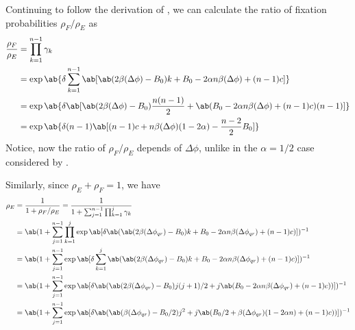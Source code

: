 Continuing to follow the derivation of \tripp{},
we can calculate the ratio of fixation probabilities $\rho_F/\rho_E$ as
\begin{equation}
  \begin{aligned}
    \frac{\rho_F}{\rho_E} &= \prod_{k=1}^{n-1} \gamma_k \\
           &= \exp \ab\{
                \delta
                \sum_{k=1}^{n-1}
                \ab[
    \ab(2 \beta(\Delta\phi) - B_0) k
                 + B_0 - 2 \alpha n \beta(\Delta\phi) + (n-1) c
                 ]
                 \} \\
           &= \exp \ab\{
                \delta
                \ab[
                \ab(2 \beta(\Delta\phi) - B_0) \frac{n(n-1)}{2}
                 + \ab(B_0 - 2 \alpha n \beta(\Delta\phi) + (n-1) c) (n-1)
                 ]
                 \} \\
           &= \exp \ab\{
                \delta (n-1)
                \ab[
                (n-1) c + n \beta(\Delta\phi) (1 - 2 \alpha)
                - \frac{n-2}{2} B_0
                 ]
                 \}
  \end{aligned}
  \label{eq:fixation_prob_ratio}
\end{equation}
Notice, now the ratio of $\rho_F/\rho_E$ depends of $\Delta \phi$,
unlike in the $\alpha=1/2$ case considered by \tripp{}.

Similarly, since $\rho_E + \rho_F = 1$, we have
\begin{equation}
  \begin{aligned}
    \rho_E &= \frac{1}{1+\rho_F/\rho_E}
           = \frac{1}{1+\sum_{j=1}^{n-1} \prod_{k=1}^j \gamma_k} \\
           &= \ab(1+\sum_{j=1}^{n-1} \prod_{k=1}^j \exp\ab[\delta \ab(
           \ab(2 \beta(\Delta\phi_{qr}) - B_0) k
           + B_0 - 2 \alpha n \beta(\Delta\phi_{qr}) + (n-1) c)])^{-1}
                 \\
           &= \ab(1+\sum_{j=1}^{n-1} \exp\ab[\delta \sum_{k=1}^j \ab(
           \ab(2 \beta(\Delta\phi_{qr}) - B_0) k
           + B_0 - 2 \alpha n \beta(\Delta\phi_{qr}) + (n-1) c)])^{-1}
                 \\
           &= \ab(1+\sum_{j=1}^{n-1} \exp\ab[\delta \ab(
           \ab(2 \beta(\Delta\phi_{qr}) - B_0) j(j+1)/2
           + j \ab(B_0 - 2 \alpha n \beta(\Delta\phi_{qr}) + (n-1) c))])^{-1}
                 \\
           &= \ab(1+\sum_{j=1}^{n-1} \exp\ab[\delta \ab(
           \ab(\beta(\Delta\phi_{qr}) - B_0/2) j^2
           + j \ab(B_0/2 + \beta(\Delta\phi_{qr}) (1 - 2 \alpha n)  + (n-1) c))])^{-1}
  \end{aligned}
  \label{eq:comm_fixation_prob}
\end{equation}

